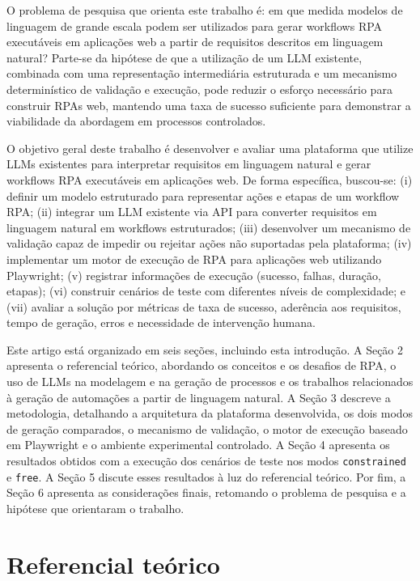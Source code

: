 \documentclass[
	article,
	12pt,
	oneside,
	a4paper,
	section=TITLE,
	english,
	brazil,
	sumario=tradicional
	]{abntex2}
\begin{document}
O problema de pesquisa que orienta este trabalho é: em que medida modelos de
linguagem de grande escala podem ser utilizados para gerar workflows RPA
executáveis em aplicações web a partir de requisitos descritos em linguagem
natural? Parte-se da hipótese de que a utilização de um LLM existente,
combinada com uma representação intermediária estruturada e um mecanismo
determinístico de validação e execução, pode reduzir o esforço necessário
para construir RPAs web, mantendo uma taxa de sucesso suficiente para
demonstrar a viabilidade da abordagem em processos controlados.

O objetivo geral deste trabalho é desenvolver e avaliar uma plataforma que
utilize LLMs existentes para interpretar requisitos em linguagem natural e
gerar workflows RPA executáveis em aplicações web. De forma específica,
buscou-se: (i) definir um modelo estruturado para representar ações e
etapas de um workflow RPA; (ii) integrar um LLM existente via API para
converter requisitos em linguagem natural em workflows estruturados; (iii)
desenvolver um mecanismo de validação capaz de impedir ou rejeitar ações não
suportadas pela plataforma; (iv) implementar um motor de execução de RPA
para aplicações web utilizando Playwright; (v) registrar informações de
execução (sucesso, falhas, duração, etapas); (vi) construir cenários de
teste com diferentes níveis de complexidade; e (vii) avaliar a solução por
métricas de taxa de sucesso, aderência aos requisitos, tempo de geração,
erros e necessidade de intervenção humana.

Este artigo está organizado em seis seções, incluindo esta introdução. A
Seção 2 apresenta o referencial teórico, abordando os conceitos e os
desafios de RPA, o uso de LLMs na modelagem e na geração de processos e os
trabalhos relacionados à geração de automações a partir de linguagem
natural. A Seção 3 descreve a metodologia, detalhando a arquitetura da
plataforma desenvolvida, os dois modos de geração comparados, o mecanismo
de validação, o motor de execução baseado em Playwright e o ambiente
experimental controlado. A Seção 4 apresenta os resultados obtidos com a
execução dos cenários de teste nos modos \texttt{constrained} e
\texttt{free}. A Seção 5 discute esses resultados à luz do referencial
teórico. Por fim, a Seção 6 apresenta as considerações finais, retomando o
problema de pesquisa e a hipótese que orientaram o trabalho.

\section{Referencial teórico}
\end{document}
